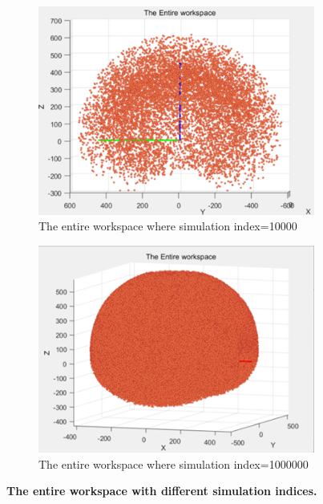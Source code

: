 \begin{figure}[H] %
    \centering 
    \captionsetup{labelsep=colon}
    \begin{subfigure}{0.45\textwidth} %
        \centering
        \includegraphics[width=\linewidth]{Image/Result/workspace_10000.png}
        \caption{\centering The entire workspace where simulation index=10000}
        \label{fig:ws_10000}
    \end{subfigure}
    \hfill
    \begin{subfigure}{0.45\textwidth} %
        \centering
        \includegraphics[width=\linewidth]{Image/Result/workspace_1000000.png}
        \caption{\centering The entire workspace where simulation index=1000000}
        \label{fig:ws_1000000}
    \end{subfigure}
    \caption[The entire workspace with different random indices]
    {\centering \textbf{The entire workspace with different simulation indices.}}
    \label{fig:ws_diff}
\end{figure}
